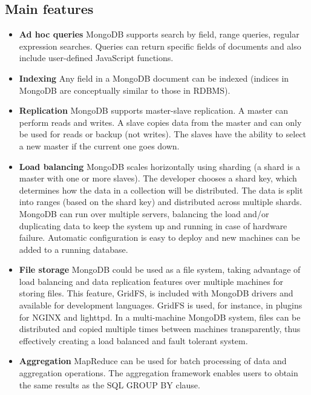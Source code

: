 \subsection{Main features} \label{features_mongo}

\begin{itemize}

\item \textbf{Ad hoc queries} 
MongoDB supports search by field, range queries, regular expression searches. Queries can return specific fields of documents and also include user-defined JavaScript functions.

\item \textbf{Indexing} 
Any field in a MongoDB document can be indexed (indices in MongoDB are conceptually similar to those in RDBMS).

\item \textbf{Replication} 
MongoDB supports master-slave replication. A master can perform reads and writes. A slave copies data from the master and can only be used for reads or backup (not writes). The slaves have the ability to select a new master if the current one goes down.

\item \textbf{Load balancing} 
MongoDB scales horizontally using sharding (a shard is a master with one or more slaves). The developer chooses a shard key, which determines how the data in a collection will be distributed. The data is split into ranges (based on the shard key) and distributed across multiple shards. MongoDB can run over multiple servers, balancing the load and/or duplicating data to keep the system up and running in case of hardware failure. Automatic configuration is easy to deploy and new machines can be added to a running database.

\item \textbf{File storage} 
MongoDB could be used as a file system, taking advantage of load balancing and data replication features over multiple machines for storing files. This feature, GridFS, is included with MongoDB drivers and available for development languages. GridFS is used, for instance, in plugins for NGINX and lighttpd. In a multi-machine MongoDB system, files can be distributed and copied multiple times between machines transparently, thus effectively creating a load balanced and fault tolerant system.

\item \textbf{Aggregation} 
MapReduce can be used for batch processing of data and aggregation operations. The aggregation framework enables users to obtain the same results as the SQL GROUP BY clause.


\end{itemize}
